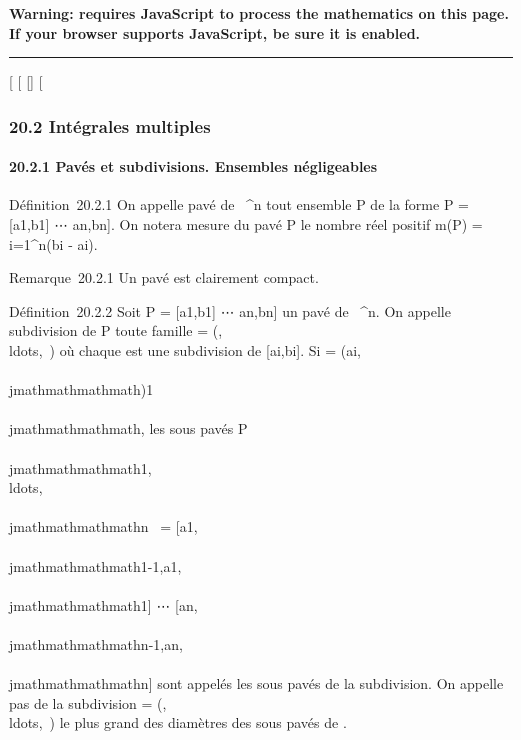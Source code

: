 \textbf{Warning: 
requires JavaScript to process the mathematics on this page.\\ If your
browser supports JavaScript, be sure it is enabled.}

\begin{center}\rule{3in}{0.4pt}\end{center}

{[}
{[}
{[}{]}
{[}

\subsubsection{20.2 Intégrales multiples}

\paragraph{20.2.1 Pavés et subdivisions. Ensembles négligeables}

Définition~20.2.1 On appelle pavé de ~^n tout ensemble P de
la forme P = {[}a1,b1{]}
\times⋯ \times {[}an,bn{]}. On
notera mesure du pavé P le nombre réel positif m(P)
= \∏ ~
i=1^n(bi - ai).

Remarque~20.2.1 Un pavé est clairement compact.

Définition~20.2.2 Soit P = {[}a1,b1{]}
\times⋯ \times {[}an,bn{]} un pavé
de ~^n. On appelle subdivision de P toute famille \sigma =
(,\\ldots,\sigman~)
où chaque \sigmai est une subdivision de
{[}ai,bi{]}. Si \sigmai =
(ai,\\\\jmathmathmathmath)1\leq\\\\jmathmathmathmath\leqni, les sous pavés
P\\\\jmathmathmathmath1,\\ldots,\\\\jmathmathmathmathn~
= {[}a1,\\\\jmathmathmathmath1-1,a1,\\\\jmathmathmathmath1{]}
\times⋯ \times
{[}an,\\\\jmathmathmathmathn-1,an,\\\\jmathmathmathmathn{]} sont appelés
les sous pavés de la subdivision. On appelle pas de la subdivision \sigma =
(,\\ldots,\sigman~)
le plus grand des diamètres des sous pavés de \sigma.

